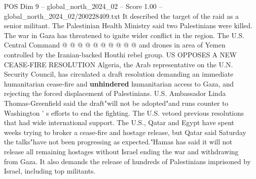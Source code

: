 \begin{textsample}{POS Dim 9 – global\_north\_2024\_02 – Score 1.00 – global\_north\_2024\_02/200228409.txt}
It described the target of the raid as a senior militant.
The Palestinian Health Ministry said two Palestinians were killed.
The war in Gaza has threatened to ignite wider conflict in the region.
The U.S.
Central Command @ @ @ @ @ @ @ @ @ @ and drones in area of Yemen controlled by the Iranian-backed Houthi rebel group.
US OPPOSES A NEW CEASE-FIRE RESOLUTION Algeria, the Arab representative on the U.N.
Security Council, has circulated a draft resolution demanding an immediate humanitarian cease-fire and \textbf{unhindered} humanitarian access to Gaza, and rejecting the forced displacement of Palestinians.
U.S.
Ambassador Linda Thomas-Greenfield said the draft"will not be adopted"and runs counter to Washington ' s efforts to end the fighting.
The U.S. vetoed previous resolutions that had wide international support.
The U.S., Qatar and Egypt have spent weeks trying to broker a cease-fire and hostage release, but Qatar said Saturday the talks"have not been progressing as expected."Hamas has said it will not release all remaining hostages without Israel ending the war and withdrawing from Gaza.
It also demands the release of hundreds of Palestinians imprisoned by Israel, including top militants.

\end{textsample}
